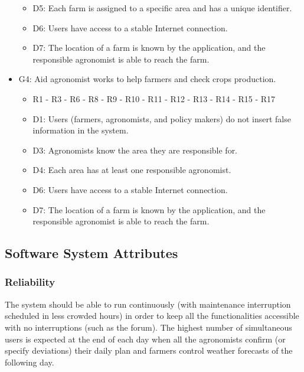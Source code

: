 \documentclass{article}
\begin{document}
\begin{itemize}
\begin{itemize}
                            \item D5: Each farm is assigned to a specific area and has a unique identifier. 
                            \item D6: Users have access to a stable Internet connection.
                            \item D7: The location of a farm is known by the application, and the responsible agronomist is able to reach the farm.
                        \end{itemize} 
        \item G4: Aid agronomist works to help farmers and check crops production.
                        \begin{itemize}
                            \item R1 - R3 - R6 - R8 - R9 - R10 - R11 - R12 - R13 - R14 - R15 - R17
                            \item D1: Users (farmers, agronomists, and policy makers) do not insert false information in the system.
                            \item D3: Agronomists know the area they are responsible for.
                            \item D4: Each area has at least one responsible agronomist.
                            \item D6: Users have access to a stable Internet connection.
                            \item D7: The location of a farm is known by the application, and the responsible agronomist is able to reach the farm.
                        \end{itemize} 	
    \end{itemize}



\newpage



\subsection{Software System Attributes}

\subsubsection{Reliability}
The system should be able to run continuously (with maintenance interruption scheduled in less crowded hours) in order to keep all the functionalities accessible with no interruptions (such as the forum). The highest number of simultaneous users is expected at the end of each day when all the agronomists confirm (or specify deviations) their daily plan and farmers control weather forecasts of the following day.
\end{document}
